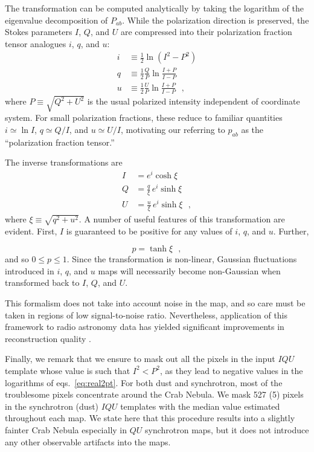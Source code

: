 \documentclass[twocolumn]{aastex631}
\begin{document}
The transformation can be computed analytically by taking the logarithm of the eigenvalue decomposition of $P_{ab}$. While the polarization direction is preserved, the Stokes parameters $I$, $Q$, and $U$ are compressed into their polarization fraction tensor analogues $i$, $q$, and $u$:
\begin{align}\label{eq:real2pt}
    i &\equiv \frac{1}{2} \ln (I^2 - P^2)\nonumber  \\
    q &\equiv  \frac{1}{2}\frac{Q}{P} \ln \frac{I+P}{I-P} \\
    u &\equiv  \frac{1}{2}\frac{U}{P} \ln \frac{I+P}{I-P}\nonumber 
    ~~~,
\end{align}
where $P \equiv \sqrt{Q^2 + U^2}$ is the usual polarized intensity independent of coordinate system. For small polarization fractions, these reduce to familiar quantities $i\simeq\ln I$, $q\simeq Q/I$, and $u\simeq U/I$, motivating our referring to $p_{ab}$ as the ``polarization fraction tensor.''

The inverse transformations are
\begin{align}\label{eq:pt2real}
    I &= e^i \cosh \xi \nonumber \\
    Q &= \frac{q}{\xi}\,e^i\sinh \xi  \\
    U &= \frac{u}{\xi}\,e^i\sinh \xi \nonumber
    ~~~,
\end{align}
where $\xi \equiv \sqrt{q^2 + u^2}$. A number of useful features of this transformation are evident. First, $I$ is guaranteed to be positive for any values of $i$, $q$, and $u$. Further,

\begin{equation}
    p = \tanh\xi
    ~~~,
\end{equation}
and so $0 \leq p \leq 1$. Since the transformation is non-linear, Gaussian fluctuations introduced in $i$, $q$, and $u$ maps will necessarily become non-Gaussian when transformed back to $I$, $Q$, and $U$.

This formalism does not take into account noise in the map, and so care must be taken in regions of low signal-to-noise ratio. Nevertheless, application of this framework to radio astronomy data has yielded significant improvements in reconstruction quality \citep{Arras:2021}.

 Finally, we remark that we ensure to  mask out all the pixels in the input $IQU$ template whose value is such that $I^2<P^2$, as they lead to negative values in the logarithms of eqs.~\eqref{eq:real2pt}.  For both dust and synchrotron, most of the troublesome pixels concentrate around the Crab Nebula. We mask  527 (5) pixels in the synchrotron (dust)  $IQU$  templates with the median value estimated throughout each map. 
We state here that this procedure  results into a slightly fainter  Crab Nebula  especially in $QU$ synchrotron maps, but it does not introduce any other observable artifacts into the maps.   
\end{document}
